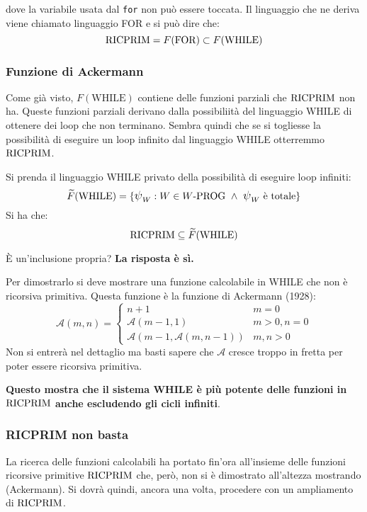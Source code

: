 dove la variabile usata dal \texttt{for} non può essere toccata. Il linguaggio che ne deriva
viene chiamato linguaggio FOR e si può dire che:
$$ \text{RICPRIM} = F(\text{FOR}) \subset F(\text{WHILE}) $$

\subsubsection{Funzione di Ackermann}
Come già visto, $F(\text{WHILE})$ contiene delle funzioni parziali che $\text{RICPRIM}$ non ha.
Queste funzioni parziali derivano dalla possibiliità del linguaggio WHILE di ottenere dei
loop che non terminano. Sembra quindi che se si togliesse la possibilità di eseguire un loop
infinito dal linguaggio WHILE otterremmo $\text{RICPRIM}$.

Si prenda il linguaggio WHILE privato della possibilità di eseguire loop infiniti:
$$ \widetilde{F}(\text{WHILE}) = 
    \{\semanticaWHILE_W:W\in W\text{-PROG}\ \wedge\ \semanticaWHILE_W\text{ è totale}\} $$
Si ha che:
$$ \text{RICPRIM}\subseteq\widetilde{F}(\text{WHILE}) $$

È un'inclusione propria? \textbf{La risposta è sì.}

Per dimostrarlo si deve mostrare una funzione calcolabile in WHILE che non è ricorsiva primitiva.
Questa funzione è la funzione di Ackermann (1928):
$$ \mathscr{A}(m,n) = \begin{cases}
    n+1 & m=0\\
    \mathscr{A}(m-1,1) & m>0,n=0\\
    \mathscr{A}(m-1,\mathscr{A}(m,n-1)) & m,n>0
\end{cases} $$
Non si entrerà nel dettaglio ma basti sapere che $\mathscr{A}$ cresce troppo in fretta per poter
essere ricorsiva primitiva.

\textbf{Questo mostra che il sistema WHILE è più potente delle funzioni in $\text{RICPRIM}$ anche
escludendo gli  cicli infiniti}.

\subsubsection{RICPRIM non basta}
La ricerca delle funzioni calcolabili ha portato fin'ora all'insieme delle funzioni ricorsive
primitive $\text{RICPRIM}$ che, però, non si è dimostrato all'altezza mostrando 
(Ackermann). Si dovrà quindi, ancora una volta, procedere con un ampliamento di $\text{RICPRIM}$.

\begin{center}
    
\end{center}
\vspace{1em}

